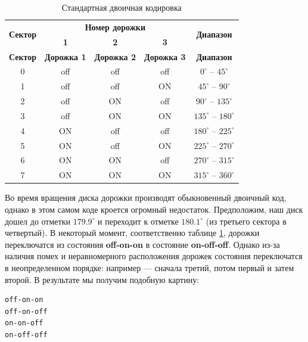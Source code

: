 \begin{longtable}[c]{|c|c|c|c|c|}
    \caption{Стандартная двоичная кодировка\label{tab:3contacts}}\\
    \hline
    \multirow{2}{*}{\textbf{Сектор}} & \multicolumn{3}{|c|}{\textbf{Номер дорожки}} & \multirow{2}{*}{\textbf{Диапазон}}\\
    \cline{2-4}
    & \textbf{1} & \textbf{2} & \textbf{3} &\\
    \hline
    \endfirsthead
    \hline
    \textbf{Сектор} & \textbf{Дорожка 1} & \textbf{Дорожка 2} & \textbf{Дорожка 3} & \textbf{Диапазон}\\
    \hline
    \endhead
    0 & off & off & off & $0^{\circ}$ -- $45^{\circ}$\\
    \hline
    1 & off & off & \cellcolor{green!20}ON & $45^{\circ}$ -- $90^{\circ}$\\
    \hline
    2 & off & \cellcolor{green!20}ON & off & $90^{\circ}$ -- $135^{\circ}$\\
    \hline
    3 & off & \cellcolor{green!20}ON & \cellcolor{green!20}ON & $135^{\circ}$ -- $180^{\circ}$\\
    \hline
    4 & \cellcolor{green!20}ON & off & off & $180^{\circ}$ -- $225^{\circ}$\\
    \hline
    5 & \cellcolor{green!20}ON & off & \cellcolor{green!20}ON & $225^{\circ}$ -- $270^{\circ}$\\
    \hline
    6 & \cellcolor{green!20}ON & \cellcolor{green!20}ON & off & $270^{\circ}$ -- $315^{\circ}$\\
    \hline
    7 & \cellcolor{green!20}ON & \cellcolor{green!20}ON & \cellcolor{green!20}ON & $315^{\circ}$ -- $360^{\circ}$\\
    \hline
\end{longtable}

Во время вращения диска дорожки производят обыкновенный двоичный код, однако в этом самом коде кроется огромный недостаток. Предположим, наш диск дошел до отметки $179.9^{\circ}$ и переходит к отметке $180.1^{\circ}$ (из третьего сектора в четвертый). В некоторый момент, соответственно таблице \ref{tab:3contacts}, дорожки переключатся из состояния \textbf{off-on-on} в состояние \textbf{on-off-off}. Однако из-за наличия помех и неравномерного расположения дорожек состояния переключатся в неопределенном порядке: например --- сначала третий, потом первый и затем второй. В результате мы получим подобную картину:

\clearpage %

\begin{verbatim}
off-on-on
off-on-off
on-on-off
on-off-off
\end{verbatim}

